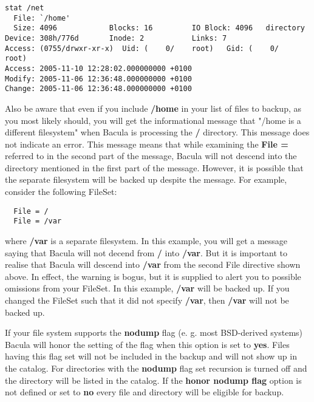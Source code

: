 \begin{description}
\begin{verbatim}
stat /net
  File: `/home'
  Size: 4096            Blocks: 16         IO Block: 4096   directory
Device: 308h/776d       Inode: 2           Links: 7
Access: (0755/drwxr-xr-x)  Uid: (    0/    root)   Gid: (    0/    root)
Access: 2005-11-10 12:28:02.000000000 +0100
Modify: 2005-11-06 12:36:48.000000000 +0100
Change: 2005-11-06 12:36:48.000000000 +0100
\end{verbatim}
\normalsize

   Also be aware that even if you include {\bf /home} in your list
   of files to backup, as you most likely should, you will get the
   informational message that  "/home is a different filesystem" when 
   Bacula is processing the {\bf /} directory.  This message does not
   indicate an error. This message means that while examining the 
   {\bf File =} referred to in the second part of the message, Bacula will 
   not descend into the directory mentioned in the first part of the message.
   However, it is possible that the separate filesystem will be backed up 
   despite the message. For example, consider the following FileSet:

\footnotesize
\begin{verbatim}
  File = /
  File = /var
\end{verbatim}
\normalsize

   where {\bf /var} is a separate filesystem.  In this example, you will get a
   message saying that Bacula will not decend from {\bf /} into {\bf /var}.  But 
   it is important to realise that Bacula will descend into {\bf /var} from the 
   second File directive shown above.  In effect, the warning is bogus,
   but it is supplied to alert you to possible omissions from your FileSet. In 
   this example, {\bf /var} will be backed up.  If you changed the FileSet such 
   that it did not specify {\bf /var}, then {\bf /var} will not be backed up.

   
\item [honor nodump flag=\lt{}yes\vb{}no\gt{}]
        If your file system supports the {\bf nodump} flag (e. g. most
        BSD-derived systems) Bacula will honor the setting of the flag
        when this option is set to {\bf yes}. Files having this flag set
        will not be included in the backup and will not show up in the
        catalog. For directories with the {\bf nodump} flag set recursion
        is turned off and the directory will be listed in the catalog.
        If the {\bf honor nodump flag} option is not defined
        or set to {\bf no} every file and directory will be eligible for
        backup.



\end{description}
